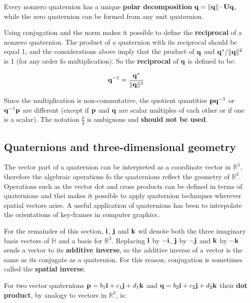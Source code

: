 Every nonzero quaternion has a unique \textbf{polar decomposition}
$ \mathbf{q} = \| {\mathbf{q}} \| \cdot \mathbf{Uq} $, while the zero quaternion can be formed
from any unit quaternion.

Using conjugation and the norm makes it possible to define the \textbf{reciprocal}
of a nonzero quaternion. The product of a quaternion with its reciprocal should
be equal 1, and the considerations above imply that the product of $ \mathbf{q} $ and
$ \mathbf{q}^{*} / \| {\mathbf{q}} \|^2 $ is 1 (for any order fo multiplication). So the
\textbf{reciprocal} of $ \mathbf{q} $ is defined to be:

\begin{equation}
    \mathbf{q}^{-1} = \frac{\mathbf{q}^{*}}{\| {\mathbf{q}} \|^2}
\end{equation}

Since the multiplication is non-commutative, the quotient quantities
$ \mathbf{p} \mathbf{q}^{-1} $ or $ \mathbf{q}^{-1} \mathbf{p} $ are different (except if $ \mathbf{p} $
and $ \mathbf{q} $ are scalar multiples of each other or if one is a scalar).
The notation $ \frac{p}{q} $ is ambiguous and \textbf{should not be used}.



\subsection{Quaternions and three-dimensional geometry}

The vector part of a quaternion can be interpreted as a coordinate vector
in $ \mathbb{R}^3 $, therefore the algebraic operations fo the quaternions reflect
the geometry of $ \mathbb{R}^3 $. Operations such as the vector dot and cross
products can be defined in terms of quaternions and thei makes it possible to apply
quaternion techniques wherever spatial vectors arise. A useful application of quaternions
has been to interpolate the orientations of key-frames in computer graphics.

For the remainder of this section, $ \mathbf{i} $, $ \mathbf{j} $ and $ \mathbf{k} $ wil denote
both the three imaginary basis vectors of $ \mathbb{H} $ and a basis for $ \mathbb{R}^3 $.
Replacing $ \mathbf{i} $ by $ -\mathbf{i} $, $ \mathbf{j} $ by $ -\mathbf{j} $ and $ \mathbf{k} $ by $ -\mathbf{k} $
sends a vector to its \textbf{additive inverse}, so the additive inverse of a vector
is the same as its conjugate as a quaternion. For this reason, conjugation
is sometimes called the \textbf{spatial inverse}.

For two vector quaternions $ \mathbf{p} = b_1 \mathbf{i} + c_1 \mathbf{j} + d_1 \mathbf{k} $ and
$ \mathbf{q} = b_2 \mathbf{i} + c_2 \mathbf{j} + d_2 \mathbf{k} $ their \textbf{dot product}, by
analogy to vectors in $ \mathbb{R}^3 $, is:

